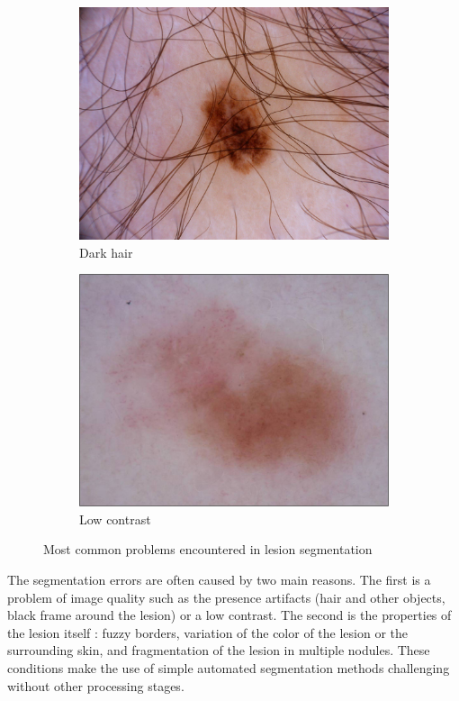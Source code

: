 \documentclass[a4paper,10pt]{article}
\begin{document}
\begin{figure}[h]
\begin{subfigure}{0.32\linewidth}
		\includegraphics[width=0.99\linewidth]{../results/data_examples/095.jpg} 
		\caption{Dark hair}
		\label{fig:hair-pb}
	\end{subfigure}
	\begin{subfigure}{0.32\linewidth}
		\includegraphics[width=0.99\linewidth]{../results/data_examples/026.jpg} 
		\caption{Low contrast}
		\label{fig:lowcontrast}
	\end{subfigure}	
	\caption{Most common problems encountered in lesion segmentation}
	\label{fig:seg_problems}
\end{figure}

The segmentation errors are often caused by two main reasons. The first is a problem of image quality such as the presence artifacts (hair and other objects, black frame around the lesion) or a low contrast. The second is the properties of the lesion itself : fuzzy borders, variation of the color of the lesion or the surrounding skin, and fragmentation of the lesion in multiple nodules. These conditions make the use of simple automated segmentation methods challenging without other processing stages.
\end{document}
